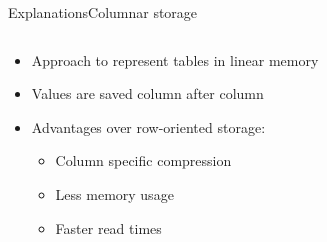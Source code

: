 \begin{frame}[t]{Explanations}{Columnar storage}
	\begin{columns}[t]
		\begin{column}[t]{0.4\linewidth}
			\begin{itemize}
				\item Approach to represent tables in linear memory
				\item Values are saved column after column\footnotemark
				\item<2-> Advantages over row-oriented storage:
				      \begin{itemize}
					      \item Column specific compression\footnotemark
					      \item Less memory usage\footnotemark[2]
					      \item Faster read times\footnotemark[1]
				      \end{itemize}


\end{itemize}
\end{column}
\end{columns}
\end{frame}
